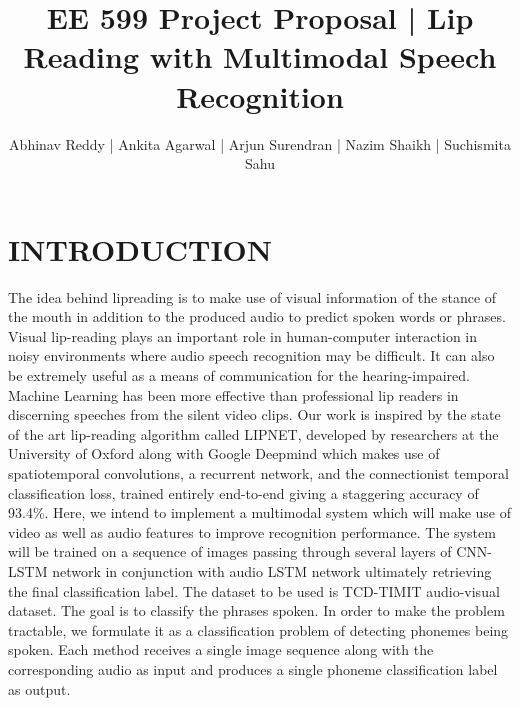 \documentclass{article}
\title{EE 599 Project Proposal | Lip Reading with Multimodal Speech Recognition}
\author{Abhinav Reddy | Ankita Agarwal | Arjun Surendran | Nazim Shaikh | Suchismita Sahu }
\begin{document}
\maketitle







\section{INTRODUCTION}
The idea behind lipreading is to make use of visual information of the stance of the mouth in addition to the produced audio to predict spoken words or phrases. Visual lip-reading plays an important role in human-computer interaction in noisy environments where audio speech recognition may be difficult. It can also be extremely useful as a means of communication for the hearing-impaired. Machine Learning has been more effective than professional lip readers in discerning speeches from the silent video clips.
Our work is inspired by the state of the art lip-reading algorithm called LIPNET, developed by researchers at the University of Oxford along with Google Deepmind which makes use of spatiotemporal convolutions, a recurrent network, and the connectionist temporal classification loss, trained entirely end-to-end giving a staggering accuracy of 93.4\%.  
Here, we intend to implement a multimodal system which will make use of video as well as audio features to improve recognition performance. The system will be trained on a sequence of images passing through several layers of CNN-LSTM network in conjunction with audio LSTM network ultimately retrieving the final classification label. The dataset to be used is TCD-TIMIT audio-visual dataset. The goal is to classify the phrases spoken. In order to make the problem tractable, we formulate it as a classification problem of detecting phonemes being spoken. Each method receives a single image sequence along with the corresponding audio as input and produces a single phoneme classification label as output.
\end{document}
